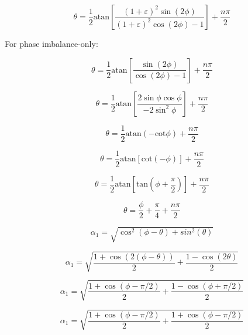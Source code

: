 \documentclass{article}
\begin{document}
\begin{equation}
	\theta = \frac{1}{2}\text{atan}\left[\frac{(1+\varepsilon)^2\sin(2\phi)}{(1+\varepsilon)^2\cos(2\phi)-1}\right]+\frac{n\pi}{2}
\end{equation}

For phase imbalance-only:

\begin{equation}
	\theta = \frac{1}{2}\text{atan}\left[\frac{\sin(2\phi)}{\cos(2\phi)-1}\right]+\frac{n\pi}{2}
\end{equation}

\begin{equation}
	\theta = \frac{1}{2}\text{atan}\left[\frac{2\sin\phi\cos\phi}{-2\sin^2\phi}\right]+\frac{n\pi}{2}
\end{equation}

\begin{equation}
	\theta = \frac{1}{2}\text{atan}(-\text{cot}\phi)+\frac{n\pi}{2}
\end{equation}

\begin{equation}
	\theta = \frac{1}{2}\text{atan}[\text{cot}(-\phi)]+\frac{n\pi}{2}
\end{equation}

\begin{equation}
	\theta = \frac{1}{2}\text{atan}\left[\text{tan}\left(\phi+\frac{\pi}{2}\right)\right]+\frac{n\pi}{2}
\end{equation}

\begin{equation}
	\theta = \frac{\phi}{2}+\frac{\pi}{4}+\frac{n\pi}{2}
\end{equation}

\begin{equation}
	\alpha_1 = \sqrt{\cos^2(\phi-\theta)+sin^2(\theta)}
\end{equation}

\begin{equation}
	\alpha_1 = \sqrt{\frac{1+\cos(2(\phi-\theta))}{2}+\frac{1-\cos(2\theta)}{2}}
\end{equation}

\begin{equation}
	\alpha_1 = \sqrt{\frac{1+\cos(\phi-\pi/2)}{2}+\frac{1-\cos(\phi+\pi/2)}{2}}
\end{equation}

\begin{equation}
	\alpha_1 = \sqrt{\frac{1+\cos(\phi-\pi/2)}{2}+\frac{1+\cos(\phi-\pi/2)}{2}}
\end{equation}
\end{document}
